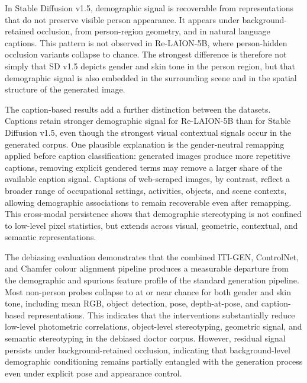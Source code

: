 In Stable Diffusion v1.5, demographic signal is recoverable from representations that do not preserve visible person appearance. It appears under background-retained occlusion, from person-region geometry, and in natural language captions. This pattern is not observed in Re-LAION-5B, where person-hidden occlusion variants collapse to chance. The strongest difference is therefore not simply that SD v1.5 depicts gender and skin tone in the person region, but that demographic signal is also embedded in the surrounding scene and in the spatial structure of the generated image.

The caption-based results add a further distinction between the datasets. Captions retain stronger demographic signal for Re-LAION-5B than for Stable Diffusion v1.5, even though the strongest visual contextual signals occur in the generated corpus. One plausible explanation is the gender-neutral remapping applied before caption classification: generated images produce more repetitive captions, removing explicit gendered terms may remove a larger share of the available caption signal. Captions of web-scraped images, by contrast, reflect a broader range of occupational settings, activities, objects, and scene contexts, allowing demographic associations to remain recoverable even after remapping. This cross-modal persistence shows that demographic stereotyping is not confined to low-level pixel statistics, but extends across visual, geometric, contextual, and semantic representations.

The debiasing evaluation demonstrates that the combined ITI-GEN, ControlNet, and Chamfer colour alignment pipeline produces a measurable departure from the demographic and spurious feature profile of the standard generation pipeline. Most non-person probes collapse to at or near chance for both gender and skin tone, including mean RGB, object detection, pose, depth-at-pose, and caption-based representations. This indicates that the interventions substantially reduce low-level photometric correlations, object-level stereotyping, geometric signal, and semantic stereotyping in the debiased doctor corpus. However, residual signal persists under background-retained occlusion, indicating that background-level demographic conditioning remains partially entangled with the generation process even under explicit pose and appearance control.
